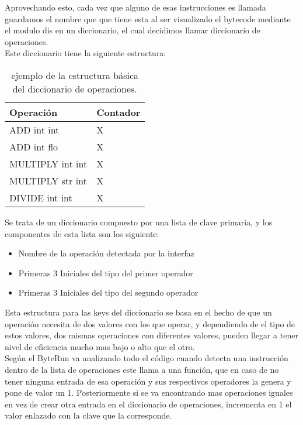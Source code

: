 Aprovechando esto, cada vez que alguno de esas instrucciones es llamada guardamos el nombre que que tiene esta al ser visualizado el bytecode mediante el modulo dis en un diccionario, el cual decidimos llamar diccionario de operaciones.\\

Este diccionario tiene la siguiente estructura:\\

\begin{table}[htbp]
\begin{center}
\begin{tabular}{|l|l|}
\hline
Operación & Contador \\
\hline \hline
ADD int int & X \\ \hline
ADD int flo & X \\ \hline
MULTIPLY int int & X \\ \hline
MULTIPLY str int & X \\ \hline
DIVIDE int int & X \\ \hline
\end{tabular}
\caption{ejemplo de la estructura básica del diccionario de operaciones.}

\label{tabla:sencilla}
\end{center}
\end{table}
Se trata de un diccionario compuesto por una lista de clave primaria, y los componentes de esta lista son los siguiente:
\begin{itemize}
	\item Nombre de la operación detectada por la interfaz
	\item Primeras 3 Iniciales del tipo del primer operador 
	\item Primeras 3 Iniciales del tipo del segundo operador 
\end{itemize}




Esta estructura para las keys del diccionario se basa en el hecho de que un operación necesita de dos valores con los que operar, y dependiendo de el tipo de estos valores, dos mismas operaciones con diferentes valores, pueden llegar a tener nivel de eficiencia mucho mas bajo o alto que el otro. \\

Según el ByteRun va analizando todo el código cuando detecta una instrucción dentro de la lista de operaciones este llama a una función, que en caso de no tener ninguna entrada de esa operación y sus respectivos operadores la genera y pone de valor un 1. Posteriormente si se va encontrando mas operaciones iguales en vez de crear otra entrada en el diccionario de operaciones, incrementa en 1 el valor enlazado con la clave que la corresponde.\\

